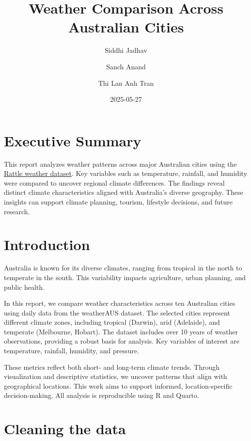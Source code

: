 \documentclass[
  letterpaper,
  DIV=11,
  numbers=noendperiod]{scrartcl}
\title{Weather Comparison Across Australian Cities}
\author{Siddhi Jadhav \and Sanch Anand \and Thi Lan Anh Tran}
\date{2025-05-27}
\renewcommand*\contentsname{Table of contents}
\newcommand\contentsname{Table of contents}
\begin{document}
\maketitle

\renewcommand*\contentsname{Table of Contents}
{
\hypersetup{linkcolor=}
\setcounter{tocdepth}{2}
\tableofcontents
}

\newpage

\section{Executive Summary}\label{executive-summary}

This report analyzes weather patterns across major Australian cities
using the
\href{https://www.kaggle.com/datasets/jsphyg/weather-dataset-rattle-package/data}{Rattle
weather dataset}. Key variables such as temperature, rainfall, and
humidity were compared to uncover regional climate differences. The
findings reveal distinct climate characteristics aligned with
Australia's diverse geography. These insights can support climate
planning, tourism, lifestyle decisions, and future research.

\section{Introduction}\label{introduction}

Australia is known for its diverse climates, ranging from tropical in
the north to temperate in the south. This variability impacts
agriculture, urban planning, and public health.

In this report, we compare weather characteristics across ten Australian
cities using daily data from the weatherAUS dataset. The selected cities
represent different climate zones, including tropical (Darwin), arid
(Adelaide), and temperate (Melbourne, Hobart). The dataset includes over
10 years of weather observations, providing a robust basis for analysis.
Key variables of interest are temperature, rainfall, humidity, and
pressure.

These metrics reflect both short- and long-term climate trends. Through
visualization and descriptive statistics, we uncover patterns that align
with geographical locations. This work aims to support informed,
location-specific decision-making. All analysis is reproducible using R
and Quarto.

\section{Cleaning the data}\label{cleaning-the-data}
\end{document}
